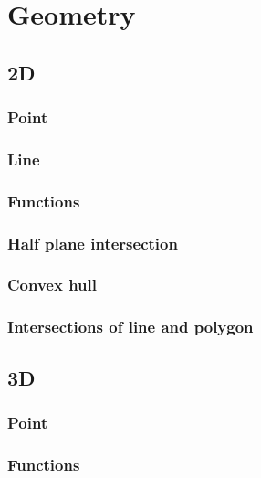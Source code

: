 \section{Geometry}
\subsection{2D}
\subsubsection{Point}

\subsubsection{Line}

\subsubsection{Functions}

\subsubsection{Half plane intersection}

\subsubsection{Convex hull}

\subsubsection{Intersections of line and polygon}

%

\subsection{3D}
\subsubsection{Point}

\subsubsection{Functions}

